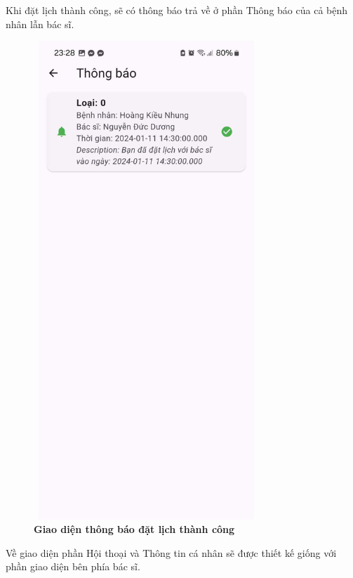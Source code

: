 Khi đặt lịch thành công, sẽ có thông báo trả về ở phần Thông báo của cả bệnh nhân lẫn bác sĩ.
\begin{figure}[H]
	\centering
	\includegraphics[width=8.5cm,height=18cm]{Images/AppUI/noti.jpg}
	\caption[Giao diện thông báo đặt lịch thành công]{\bfseries \fontsize{12pt}{0pt}\selectfont Giao diện thông báo đặt lịch thành công}
	\label{TimePickWithDoctor}
\end{figure}
Về giao diện phần Hội thoại và Thông tin cá nhân sẽ được thiết kế giống với phần giao diện bên phía bác sĩ.

